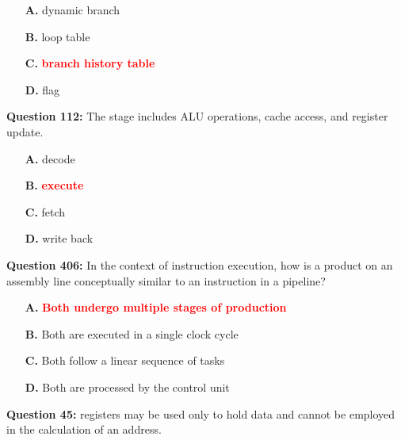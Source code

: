 \documentclass[12pt,a4paper]{article}
\begin{document}
\begin{itemize}
    \item[\textbf{A.}] dynamic branch
    \item[\textbf{B.}] loop table
    \item[\textbf{C.}] \textcolor{red}{\textbf{branch history table}}
    \item[\textbf{D.}] flag
\end{itemize}

\vspace{0.5cm}

\vspace{0.5cm}

\textbf{Question 112:} The \underline{\hspace{1.5cm}} stage includes ALU operations, cache access, and register update.

\begin{itemize}
    \item[\textbf{A.}] decode
    \item[\textbf{B.}] \textcolor{red}{\textbf{execute}}
    \item[\textbf{C.}] fetch
    \item[\textbf{D.}] write back
\end{itemize}

\vspace{0.5cm}

\vspace{0.5cm}

\textbf{Question 406:} In the context of instruction execution, how is a product on an assembly line conceptually similar to an instruction in a pipeline?

\begin{itemize}
    \item[\textbf{A.}] \textcolor{red}{\textbf{Both undergo multiple stages of production}}
    \item[\textbf{B.}] Both are executed in a single clock cycle
    \item[\textbf{C.}] Both follow a linear sequence of tasks
    \item[\textbf{D.}] Both are processed by the control unit
\end{itemize}

\vspace{0.5cm}

\vspace{0.5cm}

\textbf{Question 45:} \underline{\hspace{1.5cm}} registers may be used only to hold data and cannot be employed in the calculation of an address.
\end{document}
